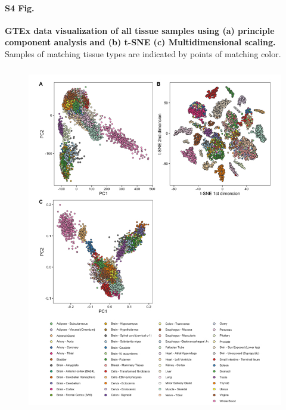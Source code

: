 \documentclass[10pt,letterpaper]{article}
\begin{document}
\paragraph*{S4 Fig.}

\label{figS4}
{\bf GTEx data visualization of all tissue samples using (a) principle component analysis and (b) t-SNE
(c) Multidimensional scaling.}
Samples of matching tissue types are indicated by points of matching color.
\begin{figure}[ht]
\centering
\includegraphics[height=6in, width=5in]{../../src/figure/gtex-other-methods.Rmd/gtex-with-legend.png}
\end{figure}
\end{document}
